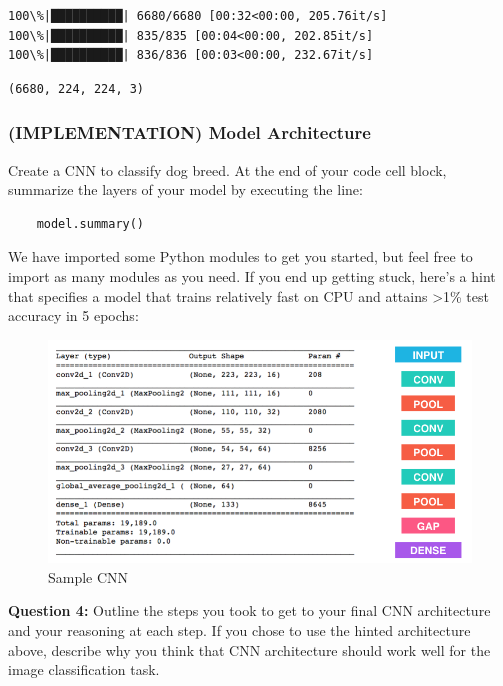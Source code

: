 \documentclass[11pt]{article}
\makeatletter
\def\maxwidth{\ifdim\Gin@nat@width>\linewidth\linewidth
    \else\Gin@nat@width\fi}
\let\Oldincludegraphics\includegraphics
\renewcommand{\includegraphics}[1]{\Oldincludegraphics[width=.8\maxwidth]{#1}}
\makeatother
\begin{document}
    \begin{Verbatim}[commandchars=\\\{\}]
100\%|██████████| 6680/6680 [00:32<00:00, 205.76it/s]
100\%|██████████| 835/835 [00:04<00:00, 202.85it/s]
100\%|██████████| 836/836 [00:03<00:00, 232.67it/s]

    \end{Verbatim}

    \begin{Verbatim}[commandchars=\\\{\}]
(6680, 224, 224, 3)

    \end{Verbatim}

    \subsubsection{(IMPLEMENTATION) Model
Architecture}\label{implementation-model-architecture}

Create a CNN to classify dog breed. At the end of your code cell block,
summarize the layers of your model by executing the line:

\begin{verbatim}
    model.summary()
\end{verbatim}

We have imported some Python modules to get you started, but feel free
to import as many modules as you need. If you end up getting stuck,
here's a hint that specifies a model that trains relatively fast on CPU
and attains \textgreater{}1\% test accuracy in 5 epochs:

\begin{figure}
\centering
\includegraphics{images/sample_cnn.png}
\caption{Sample CNN}
\end{figure}

\textbf{Question 4:} Outline the steps you took to get to your final CNN
architecture and your reasoning at each step. If you chose to use the
hinted architecture above, describe why you think that CNN architecture
should work well for the image classification task.
\end{document}
